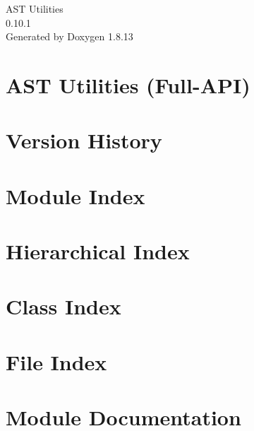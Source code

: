 \documentclass[twoside]{book}
\newcommand{\+}{\discretionary{\mbox{\scriptsize$\hookleftarrow$}}{}{}}
\newcommand{\clearemptydoublepage}{%
  \newpage{\pagestyle{empty}\cleardoublepage}%
}
\begin{document}
\hypersetup{pageanchor=false,
             bookmarksnumbered=true,
             pdfencoding=unicode
            }
\begin{titlepage}
\vspace*{7cm}
\begin{center}%
{\Large A\+ST Utilities \\[1ex]\large 0.\+10.\+1 }\\
\vspace*{1cm}
{\large Generated by Doxygen 1.8.13}\\
\end{center}
\end{titlepage}
\clearemptydoublepage
{}
\tableofcontents
\clearemptydoublepage
{}
\hypersetup{pageanchor=true}

\chapter{A\+ST Utilities (Full-\/\+A\+PI)}
\label{index}\hypertarget{index}{}
\chapter{Version History}
\label{CHANGES}

\chapter{Module Index}

\chapter{Hierarchical Index}

\chapter{Class Index}

\chapter{File Index}

\chapter{Module Documentation}







\end{document}
